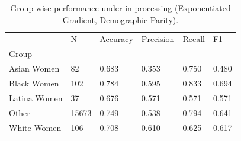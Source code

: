 \begin{table}[htbp]
\centering
\caption{Group-wise performance under in-processing (Exponentiated Gradient, Demographic Parity).}
\label{tab:11-inproc-group-metrics}
\begin{tabular}{llllll}
\toprule
 & N & Accuracy & Precision & Recall & F1 \\
Group &  &  &  &  &  \\
\midrule
Asian Women & 82 & 0.683 & 0.353 & 0.750 & 0.480 \\
Black Women & 102 & 0.784 & 0.595 & 0.833 & 0.694 \\
Latina Women & 37 & 0.676 & 0.571 & 0.571 & 0.571 \\
Other & 15673 & 0.749 & 0.538 & 0.794 & 0.641 \\
White Women & 106 & 0.708 & 0.610 & 0.625 & 0.617 \\
\bottomrule
\end{tabular}

\end{table}